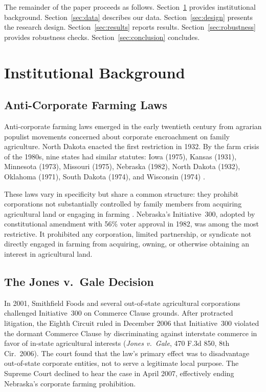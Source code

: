 \documentclass[12pt]{article}
\begin{document}
The remainder of the paper proceeds as follows. Section~\ref{sec:background} provides institutional background. Section~\ref{sec:data} describes our data. Section~\ref{sec:design} presents the research design. Section~\ref{sec:results} reports results. Section~\ref{sec:robustness} provides robustness checks. Section~\ref{sec:conclusion} concludes.

\section{Institutional Background}\label{sec:background}

\subsection{Anti-Corporate Farming Laws}

Anti-corporate farming laws emerged in the early twentieth century from agrarian populist movements concerned about corporate encroachment on family agriculture. North Dakota enacted the first restriction in 1932. By the farm crisis of the 1980s, nine states had similar statutes: Iowa (1975), Kansas (1931), Minnesota (1973), Missouri (1975), Nebraska (1982), North Dakota (1932), Oklahoma (1971), South Dakota (1974), and Wisconsin (1974) \citep{Aiken2000}.

These laws vary in specificity but share a common structure: they prohibit corporations not substantially controlled by family members from acquiring agricultural land or engaging in farming \citep{Dillman2007}. Nebraska's Initiative~300, adopted by constitutional amendment with 56\% voter approval in 1982, was among the most restrictive. It prohibited any corporation, limited partnership, or syndicate not directly engaged in farming from acquiring, owning, or otherwise obtaining an interest in agricultural land.

\subsection{The Jones v.\ Gale Decision}

In 2001, Smithfield Foods and several out-of-state agricultural corporations challenged Initiative~300 on Commerce Clause grounds. After protracted litigation, the Eighth Circuit ruled in December 2006 that Initiative~300 violated the dormant Commerce Clause by discriminating against interstate commerce in favor of in-state agricultural interests (\textit{Jones v.\ Gale}, 470 F.3d 850, 8th Cir.\ 2006). The court found that the law's primary effect was to disadvantage out-of-state corporate entities, not to serve a legitimate local purpose. The Supreme Court declined to hear the case in April 2007, effectively ending Nebraska's corporate farming prohibition.
\end{document}
